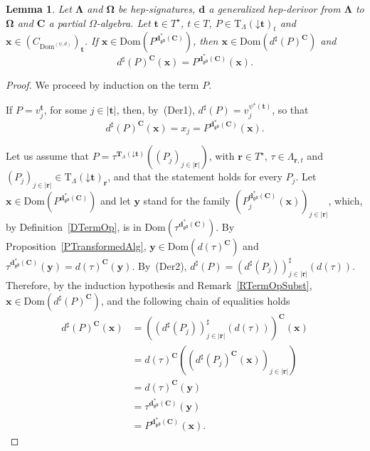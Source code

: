 \documentclass[a4paper, reqno]{amsbook}
\newcommand{\bb}[1]{\ensuremath{\lvert #1 \rvert}}
\newcommand{\vs}[1]{\mathbin{\downarrow}#1}
\newcommand{\sig}[1]{\mathbf{#1}}             %
\newcommand{\Dom}{\mathrm{Dom}}
\newcommand{\gd}{\mathfrak{gd}}              %
\theoremstyle{plain}
\newtheorem{lemma}[theorem]{Lemma}
\theoremstyle{definition}
\begin{document}
\begin{lemma}\label{LGenHepDerivorTermOp}
Let $\sig{\Lambda}$ and $\sig{\Omega}$ be hep-signatures, $\mathbf{d}$ a generalized hep-derivor from $\sig{\Lambda}$ to $\sig{\Omega}$ and $\mathbf{C}$ a partial $\Omega$-algebra.
Let $\mathbf{t}\in T^{\star}$, $t\in T$, $P\in\mathrm{T}_{\Lambda}(\vs{\mathbf{t}})_{t}$ and $\mathbf{x}\in(C_{\Dom^{(\psi,d)}})_{\mathbf{t}}$.
If $\mathbf{x}\in\Dom(P^{\mathbf{d}^{\ast}_{\gd}(\mathbf{C})})$, then $\mathbf{x}\in\Dom(d^{\sharp}(P)^{\mathbf{C}})$ and
$$
d^{\sharp}(P)^{\mathbf{C}}(\mathbf{x})=P^{\mathbf{d}^{\ast}_{\gd}(\mathbf{C})}(\mathbf{x}).
$$
\end{lemma}
\begin{proof}
We proceed by induction on the term $P$.

If $P=v^{\mathbf{t}}_{j}$, for some $j\in\bb{\mathbf{t}}$, then, by~(Der1), $d^{\sharp}(P)=v^{\psi^{\star}(\mathbf{t})}_{j}$, so that 
\[d^{\sharp}(P)^{\mathbf{C}}(\mathbf{x})=x_{j}=P^{\mathbf{d}^{\ast}_{\gd}(\mathbf{C})}(\mathbf{x}).\]

Let us assume that $P=\tau^{\mathbf{T}_{\Lambda}(\vs{\mathbf{t}})}((P_{j})_{j\in\bb{\mathbf{r}}})$, with $\mathbf{r}\in T^{\star}$, $\tau\in\Lambda_{\mathbf{r},t}$ and $(P_{j})_{j\in\bb{\mathbf{r}}}\in\mathrm{T}_{\Lambda}(\vs{\mathbf{t}})_{\mathbf{r}}$, and that the statement holds for every $P_{j}$.
Let $\mathbf{x}\in\Dom(P^{\mathbf{d}^{\ast}_{\gd}(\mathbf{C})})$ and let $\mathbf{y}$ stand for the family $(P_{j}^{\mathbf{d}^{\ast}_{\gd}(\mathbf{C})}(\mathbf{x}))_{j\in\bb{\mathbf{r}}}$, which, by Definition~\ref{DTermOp}, is in $\Dom(\tau^{\mathbf{d}^{\ast}_{\gd}(\mathbf{C})})$.
By Proposition~\ref{PTransformedAlg}, $\mathbf{y}\in\Dom(d(\tau)^{\mathbf{C}})$ and $\tau^{\mathbf{d}^{\ast}_{\gd}(\mathbf{C})}(\mathbf{y})=d(\tau)^{\mathbf{C}}(\mathbf{y})$.
By~(Der2), $d^{\sharp}(P)=(d^{\sharp}(P_{j}))^{\sharp}_{j\in\bb{\mathbf{r}}}(d(\tau))$.
Therefore, by the induction hypothesis and Remark~\ref{RTermOpSubst}, $\mathbf{x}\in\Dom(d^{\sharp}(P)^{\mathbf{C}})$, and the following chain of equalities holds
\begin{align*}
d^{\sharp}(P)^{\mathbf{C}}\left(\mathbf{x}\right)
&=
\left(\left(d^{\sharp}(P_{j})\right)^{\sharp}_{j\in\bb{\mathbf{r}}}\left(d(\tau)\right)\right)^{\mathbf{C}}\left(\mathbf{x}\right)
\tag{1}
\\&=
d(\tau)^{\mathbf{C}}\left(\left(d^{\sharp}(P_{j})^{\mathbf{C}}(\mathbf{x})\right)_{j\in\bb{\mathbf{r}}}\right)
\tag{2}
\\&=
d(\tau)^{\mathbf{C}}\left(\mathbf{y}\right)
\tag{3}
\\&=
\tau^{\mathbf{d}^{\ast}_{\gd}(\mathbf{C})}\left(\mathbf{y}\right)
\tag{4}
\\&=
P^{\mathbf{d}^{\ast}_{\gd}(\mathbf{C})}\left(\mathbf{x}\right).
\tag{5}
\end{align*}


\end{proof}
\end{document}
